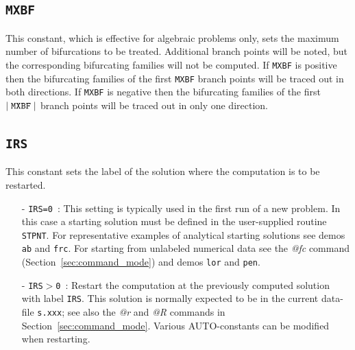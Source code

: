 \documentclass[12pt]{report}
\def\abs#1{\mid#1\mid}
\begin{document}
\subsection{\tt MXBF}  \label{sec:MXBF}
 This constant, which is effective for algebraic problems only,
 sets the maximum number of bifurcations to be treated.
 Additional branch points will be noted, but the corresponding bifurcating
 families will not be computed.
 If {\tt MXBF} is positive then the bifurcating families of the first {\tt MXBF}
  branch points will be traced out in both directions.
 If {\tt MXBF} is negative then the bifurcating families of the first 
 $\abs{{\tt MXBF}}$ branch points will be traced out in only one direction. 

\subsection{\tt IRS}  \label{sec:IRS}
This constant sets the label of the solution where the computation
is to be restarted.
\begin{itemize}
\item[-] {\tt IRS=0}~:  
  This setting is typically used in the first run of a new problem.
  In this case a starting solution must be defined in the user-supplied
  routine {\tt STPNT}.
  For representative examples of analytical starting solutions 
  see demos {\tt ab} and {\tt frc}.
  For starting from unlabeled numerical data see the {\it @fc} command
  (Section~\ref{sec:command_mode}) and demos {\tt lor} and {\tt pen}.
  
\item[-] {\tt IRS$>$0}~: 
  Restart the computation at the previously computed solution with label {\tt IRS}. 
  This solution is normally expected to be in the current data-file 
 {\tt s.xxx}; see also the {\it @r} and {\it @R} commands in 
 Section~\ref{sec:command_mode}.
 Various {\cal AUTO}-constants can be modified when restarting.
\end{itemize}
\end{document}
